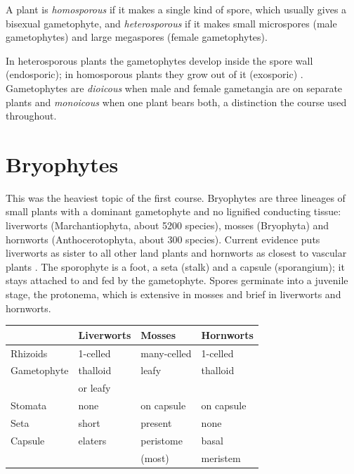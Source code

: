 \begin{definition}
\label{definition-heterospory}
A plant is \emph{homosporous} if it makes a
single kind of spore, which usually gives a
bisexual gametophyte, and
\emph{heterosporous} if it makes small
microspores (male gametophytes) and large
megaspores (female gametophytes).
\end{definition}

In heterosporous plants the gametophytes
develop inside the spore wall
(endosporic); in homosporous plants they
grow out of it (exosporic)
\cite[Chapter 17]{evert2013raven}.
Gametophytes are \emph{dioicous} when male
and female gametangia are on separate
plants and \emph{monoicous} when one plant
bears both, a distinction the course used
throughout.

\section{Bryophytes}
\label{section-bryophytes}

This was the heaviest topic of the first
course. Bryophytes are three lineages of
small plants with a dominant gametophyte
and no lignified conducting tissue:
liverworts (Marchantiophyta, about 5200
species), mosses (Bryophyta) and hornworts
(Anthocerotophyta, about 300 species).
Current evidence puts liverworts as sister
to all other land plants and hornworts as
closest to vascular plants
\cite[Chapter 16]{evert2013raven}. The
sporophyte is a foot, a seta (stalk) and a
capsule (sporangium); it stays attached to
and fed by the gametophyte. Spores
germinate into a juvenile stage, the
protonema, which is extensive in mosses and
brief in liverworts and hornworts.

\begin{center}
\begin{tabular}{llll}
& Liverworts & Mosses & Hornworts \\
\hline
Rhizoids & 1-celled & many-celled &
1-celled \\
Gametophyte & thalloid & leafy &
thalloid \\
& or leafy & & \\
Stomata & none & on capsule &
on capsule \\
Seta & short & present & none \\
Capsule & elaters & peristome & basal \\
& & (most) & meristem \\
\end{tabular}
\end{center}

